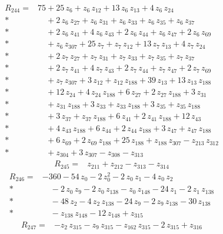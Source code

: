 \documentclass[10pt]{article}
\begin{document}
\begin{align*}
R_{244}={}& 75 + 25\,z_{6} + z_{6}\,z_{12} + 13\,z_{6}\,z_{13} + 4\,z_{6}\,z_{24} \\*
&\quad + 2\,z_{6}\,z_{27} + z_{6}\,z_{31} + z_{6}\,z_{33} + z_{6}\,z_{35} + z_{6}\,z_{37} \\*
&\quad + 2\,z_{6}\,z_{41} + 4\,z_{6}\,z_{43} + 2\,z_{6}\,z_{44} + z_{6}\,z_{47} + 2\,z_{6}\,z_{69} \\*
&\quad + z_{6}\,z_{307} + 25\,z_{7} + z_{7}\,z_{12} + 13\,z_{7}\,z_{13} + 4\,z_{7}\,z_{24} \\*
&\quad + 2\,z_{7}\,z_{27} + z_{7}\,z_{31} + z_{7}\,z_{33} + z_{7}\,z_{35} + z_{7}\,z_{37} \\*
&\quad + 2\,z_{7}\,z_{41} + 4\,z_{7}\,z_{43} + 2\,z_{7}\,z_{44} + z_{7}\,z_{47} + 2\,z_{7}\,z_{69} \\*
&\quad + z_{7}\,z_{307} + 3\,z_{12} + z_{12}\,z_{188} + 39\,z_{13} + 13\,z_{13}\,z_{188} \\*
&\quad + 12\,z_{24} + 4\,z_{24}\,z_{188} + 6\,z_{27} + 2\,z_{27}\,z_{188} + 3\,z_{31} \\*
&\quad + z_{31}\,z_{188} + 3\,z_{33} + z_{33}\,z_{188} + 3\,z_{35} + z_{35}\,z_{188} \\*
&\quad + 3\,z_{37} + z_{37}\,z_{188} + 6\,z_{41} + 2\,z_{41}\,z_{188} + 12\,z_{43} \\*
&\quad + 4\,z_{43}\,z_{188} + 6\,z_{44} + 2\,z_{44}\,z_{188} + 3\,z_{47} + z_{47}\,z_{188} \\*
&\quad + 6\,z_{69} + 2\,z_{69}\,z_{188} + 25\,z_{188} + z_{188}\,z_{307} - z_{213}\,z_{312} \\*
&\quad + z_{304} + 3\,z_{307} - z_{308} - z_{313}
\end{align*}
\begin{align*}
R_{245}={}& z_{211} + z_{212} - z_{313} - z_{314}
\end{align*}
\begin{align*}
R_{246}={}& - 360 - 54\,z_{0} - 2\,z_{0}^{2} - 2\,z_{0}\,z_{1} - 4\,z_{0}\,z_{2} \\*
&\quad - 2\,z_{0}\,z_{9} - 2\,z_{0}\,z_{138} - z_{0}\,z_{148} - 24\,z_{1} - 2\,z_{1}\,z_{138} \\*
&\quad - 48\,z_{2} - 4\,z_{2}\,z_{138} - 24\,z_{9} - 2\,z_{9}\,z_{138} - 30\,z_{138} \\*
&\quad - z_{138}\,z_{148} - 12\,z_{148} + z_{315}
\end{align*}
\begin{align*}
R_{247}={}& - z_{2}\,z_{315} - z_{9}\,z_{315} - z_{162}\,z_{315} - 2\,z_{315} + z_{316}
\end{align*}
\end{document}

